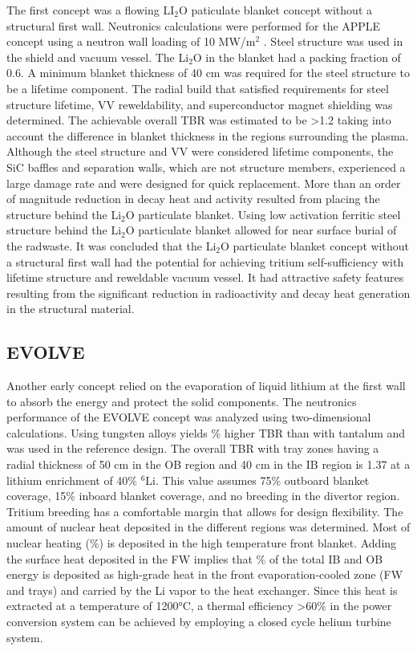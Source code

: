 The first concept was a flowing LI$_2$O paticulate blanket concept without a
structural first wall.  Neutronics calculations were performed for the
\gls{APPLE} concept using a neutron wall loading of 10 MW/m$^2$ . Steel
structure was used in the shield and vacuum vessel. The Li$_2$O in the blanket
had a packing fraction of 0.6. A minimum blanket thickness of 40 cm was
required for the steel structure to be a lifetime component. The radial build
that satisfied requirements for steel structure lifetime, VV reweldability,
and superconductor magnet shielding was determined. The achievable overall TBR
was estimated to be >1.2 taking into account the difference in blanket
thickness in the regions surrounding the plasma. Although the steel structure
and VV were considered lifetime components, the SiC baffles and separation
walls, which are not structure members, experienced a large damage rate and
were designed for quick replacement. More than an order of magnitude reduction
in decay heat and activity resulted from placing the structure behind the
Li$_2$O particulate blanket. Using low activation ferritic steel structure
behind the Li$_2$O particulate blanket allowed for near surface burial of the
radwaste.  It was concluded that the Li$_2$O particulate blanket concept
without a structural first wall had the potential for achieving tritium
self-sufficiency with lifetime structure and reweldable vacuum vessel.  It had
attractive safety features resulting from the significant reduction in
radioactivity and decay heat generation in the structural
material.

\subsection{\acrfull{EVOLVE}}

Another early concept relied on the evaporation of liquid lithium at the first
wall to absorb the energy and protect the solid components.  The neutronics
performance of the EVOLVE concept was analyzed using two-dimensional
calculations. Using tungsten alloys yields \% higher TBR than
with tantalum and was used in the reference design. The overall TBR with tray
zones having a radial thickness of 50 cm in the \gls{OB} region and 40 cm in
the \gls{IB} region is 1.37 at a lithium enrichment of 40\% $^6$Li. This value
assumes 75\% outboard blanket coverage, 15\% inboard blanket coverage, and no
breeding in the divertor region. Tritium breeding has a comfortable margin
that allows for design flexibility. The amount of nuclear heat deposited in
the different regions was determined. Most of nuclear heating (\%) is deposited in the high temperature front blanket. Adding the surface
heat deposited in the \gls{FW} implies that \% of the total
\gls{IB} and \gls{OB} energy is deposited as high-grade heat in the front
evaporation-cooled zone (\gls{FW} and trays) and carried by the Li vapor to
the heat exchanger. Since this heat is extracted at a temperature of 1200°C, a
thermal efficiency >60\% in the power conversion system can be achieved by
employing a closed cycle helium turbine system.

